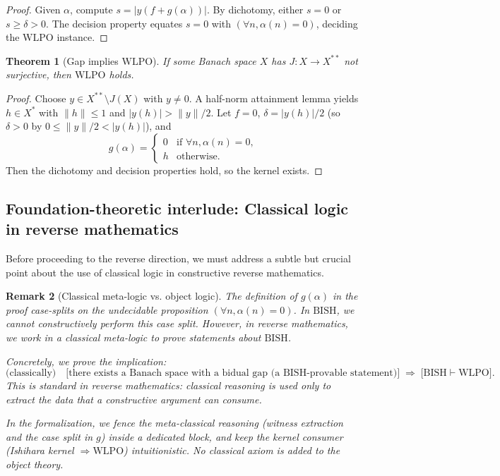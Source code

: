 \documentclass[11pt]{article}  %
\newtheorem{theorem}{Theorem}[section]
\newtheorem{remark}[theorem]{Remark}
\newenvironment{thm}{\begin{theorem}}{\end{theorem}}
\newenvironment{rem}{\begin{remark}}{\end{remark}}
\newtheorem{theorem}{Theorem}[section]
\newtheorem{remark}[theorem]{Remark}
\newenvironment{thm}{\begin{theorem}}{\end{theorem}}
\newenvironment{rem}{\begin{remark}}{\end{remark}}
\newcommand{\WLPO}{\mathrm{WLPO}}
\newcommand{\BISH}{\mathrm{BISH}}
\begin{document}
\begin{proof}
Given $\alpha$, compute $s=|y(f+g(\alpha))|$. By dichotomy, either $s=0$ or $s\ge \delta>0$. The decision property equates $s=0$ with $(\forall n,\alpha(n)=0)$, deciding the $\WLPO$ instance.
\end{proof}

\begin{thm}[Gap implies $\WLPO$]\label{thm:gap-implies-wlpo}
If some Banach space $X$ has $J:X\to X^{**}$ not surjective, then $\WLPO$ holds.
\end{thm}

\begin{proof}
Choose $y\in X^{**}\setminus J(X)$ with $y\ne 0$. A half-norm attainment lemma yields $h\in X^*$ with $\|h\|\le 1$ and $|y(h)|>\|y\|/2$. Let $f=0$, $\delta=|y(h)|/2$ (so $\delta>0$ by $0 \leq \|y\|/2 < |y(h)|$), and
\[
g(\alpha)=\begin{cases}
0 & \text{if } \forall n,\alpha(n)=0,\\
h & \text{otherwise}.
\end{cases}
\]
Then the dichotomy and decision properties hold, so the kernel exists.
\end{proof}

\subsection{Foundation-theoretic interlude: Classical logic in reverse mathematics}

Before proceeding to the reverse direction, we must address a subtle but crucial point about the use of classical logic in constructive reverse mathematics.

\begin{rem}[Classical meta-logic vs. object logic]\label{rem:meta-classical}
The definition of $g(\alpha)$ in the proof case-splits on the undecidable proposition
$(\forall n,\alpha(n)=0)$. In $\BISH$, we cannot constructively perform this case split.
However, in reverse mathematics, we work in a \emph{classical meta-logic} to prove
statements \emph{about} $\BISH$.

Concretely, we prove the implication:
\[
  \text{(classically)}\quad
  \big[\text{there exists a Banach space with a bidual gap (a $\BISH$-provable statement)}\big]
  \;\Longrightarrow\;
  \big[\BISH \vdash \WLPO\big].
\]
This is standard in reverse mathematics: classical reasoning is used only to
\emph{extract} the data that a constructive argument can \emph{consume}.

In the formalization, we fence the meta-classical reasoning (witness extraction and
the case split in $g$) inside a dedicated block, and keep the kernel consumer
(\emph{Ishihara kernel} $\Rightarrow \WLPO$) intuitionistic. No classical axiom
is added to the object theory.
\end{rem}
\end{document}
